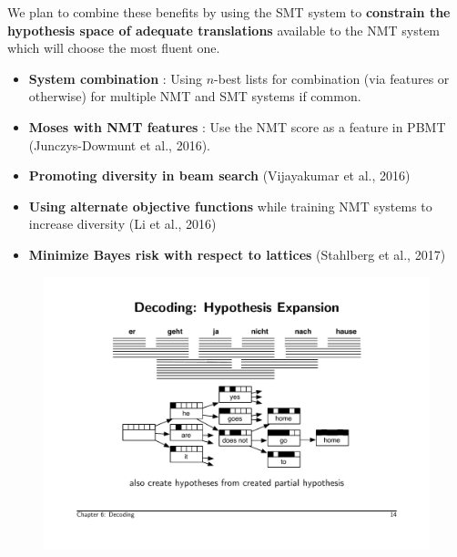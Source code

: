\documentclass[landscape]{jhuslides3C}
\begin{document}
We plan to combine these benefits by using the SMT system to \textbf{constrain the hypothesis space of adequate translations} available to the NMT system which will choose the most fluent one.

\begin{itemize}
\item \textbf{System combination} : Using $n$-best lists for combination (via features or otherwise) for multiple NMT and SMT systems if common.
\item \textbf{Moses with NMT features} : Use the NMT score as a feature in PBMT (Junczys-Dowmunt et al., 2016).
\item \textbf{Promoting diversity in beam search} (Vijayakumar et al., 2016) 
\item \textbf{Using alternate objective functions} while training NMT systems to increase diversity (Li et al., 2016)
\item \textbf{Minimize Bayes risk with respect to lattices} (Stahlberg et al., 2017)
\end{itemize}


\begin{figure}
\begin{center}
\includegraphics[scale=1.2]{images/graph.pdf}
\end{center}
\end{figure}
\end{document}
